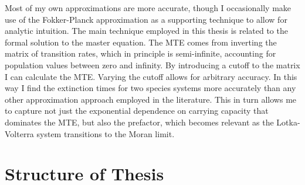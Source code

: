 %
Most of my own approximations are more accurate, though I occasionally make use of the Fokker-Planck approximation as a supporting technique to allow for analytic intuition. 
The main technique employed in this thesis is related to the formal solution to the master equation. 
The MTE comes from inverting the matrix of transition rates, which in principle is semi-infinite, accounting for population values between zero and infinity. 
By introducing a cutoff to the matrix I can calculate the MTE. 
Varying the cutoff allows for arbitrary accuracy. 
In this way I find the extinction times for two species systems more accurately than any other approximation approach employed in the literature. 
This in turn allows me to capture not just the exponential dependence on carrying capacity that dominates the MTE, but also the prefactor, which becomes relevant as the Lotka-Volterra system transitions to the Moran limit. 

\fi



\section{Structure of Thesis}

